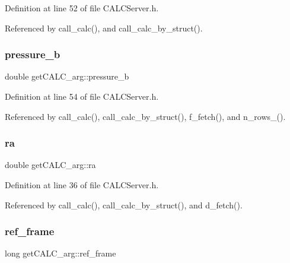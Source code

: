 Definition at line 52 of file C\+A\+L\+C\+Server.\+h.



Referenced by call\+\_\+calc(), and call\+\_\+calc\+\_\+by\+\_\+struct().

\mbox{\label{structget_c_a_l_c__arg_a62e1f625545995f2423601581867bcd2}} 
\subsubsection{\texorpdfstring{pressure\+\_\+b}{pressure\_b}}
{\footnotesize\ttfamily double get\+C\+A\+L\+C\+\_\+arg\+::pressure\+\_\+b}



Definition at line 54 of file C\+A\+L\+C\+Server.\+h.



Referenced by call\+\_\+calc(), call\+\_\+calc\+\_\+by\+\_\+struct(), f\+\_\+fetch(), and n\+\_\+rows\+\_\+().

\mbox{\label{structget_c_a_l_c__arg_a406c17384ed574e7edf926ff81b6177b}} 
\subsubsection{\texorpdfstring{ra}{ra}}
{\footnotesize\ttfamily double get\+C\+A\+L\+C\+\_\+arg\+::ra}



Definition at line 36 of file C\+A\+L\+C\+Server.\+h.



Referenced by call\+\_\+calc(), call\+\_\+calc\+\_\+by\+\_\+struct(), and d\+\_\+fetch().

\mbox{\label{structget_c_a_l_c__arg_a14bd27e5cca9ca1ffd48f05648feb624}} 
\subsubsection{\texorpdfstring{ref\+\_\+frame}{ref\_frame}}
{\footnotesize\ttfamily long get\+C\+A\+L\+C\+\_\+arg\+::ref\+\_\+frame}



